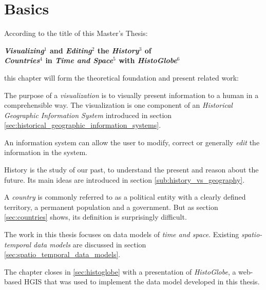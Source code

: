 
\chapter{Basics} %
\label{cha:basics}

According to the title of this Master's Thesis:

\vspace{-1em}
\begin{large}
\begin{center}
  \textbf{
    \emph{Visualizing}$^1$ and \emph{Editing}$^2$ the \emph{History}$^3$ of\\
    \emph{Countries}$^4$ in \emph{Time and Space}$^5$ with \emph{HistoGlobe}$^6$
  }
\end{center}
\end{large}
\vspace{-1em}

this chapter will form the theoretical foundation and present related work:

\begin{description}[labelindent=1.53em]
  \item[$^1$] The purpose of a \emph{visualization} is to visually present information to a human in a comprehensible way. The visualization is one component of an \emph{Historical Geographic Information System} introduced in section \ref{sec:historical_geographic_information_systems}.
  \item[$^2$] An information system can allow the user to modify, correct or generally \emph{edit} the information in the system.
  \item[$^3$] History is the study of our past, to understand the present and reason about the future. Its main ideas are introduced in section \ref{sub:history_vs_geography}.
  \item[$^4$] A \emph{country} is commonly referred to as a political entity with a clearly defined territory, a permanent population and a government. But as section \ref{sec:countries} shows, its definition is surprisingly difficult.
  \item[$^5$] The work in this thesis focuses on data models of \emph{time and space}. Existing \emph{spatio-temporal data models} are discussed in section \ref{sec:spatio_temporal_data_models}.
  \item[$^6$] The chapter closes in \ref{sec:histoglobe} with a presentation of \emph{HistoGlobe}, a web-based HGIS that was used to implement the data model developed in this thesis.
\end{description}

